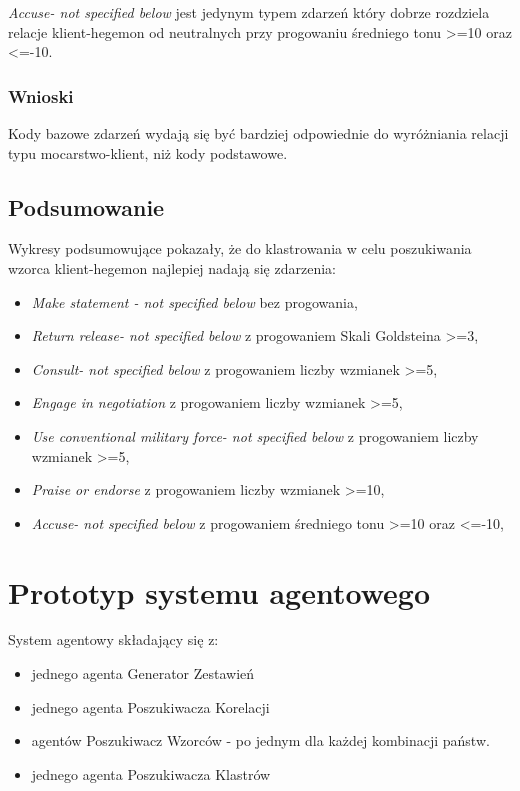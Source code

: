 \documentclass[11pt]{report}
\begin{document}
    \textit{Accuse- not specified below} jest jedynym typem zdarzeń który dobrze rozdziela relacje klient-hegemon od neutralnych
    przy progowaniu średniego tonu >=10 oraz <=-10.

    \subsubsection{Wnioski}
    Kody bazowe zdarzeń wydają się być bardziej odpowiednie do wyróżniania relacji typu mocarstwo-klient, niż kody podstawowe.

    \subsection{Podsumowanie}

    Wykresy podsumowujące pokazały, że do klastrowania w celu poszukiwania wzorca klient-hegemon najlepiej nadają się zdarzenia:
    \begin{itemize}
        \item \textit{Make statement - not specified below} bez progowania,
        \item \textit{Return release- not specified below} z progowaniem Skali Goldsteina >=3,
        \item \textit{Consult- not specified below} z progowaniem liczby wzmianek >=5,
        \item \textit{Engage in negotiation} z progowaniem liczby wzmianek >=5,
        \item \textit{Use conventional military force- not specified below} z progowaniem liczby wzmianek >=5,
        \item \textit{Praise or endorse} z progowaniem liczby wzmianek >=10,
        \item \textit{Accuse- not specified below} z progowaniem średniego tonu >=10 oraz <=-10,
    \end{itemize}


    \section{Prototyp systemu agentowego}

    System agentowy składający się z:
    \begin{itemize}
        \item jednego agenta Generator Zestawień
        \item jednego agenta Poszukiwacza Korelacji
        \item agentów Poszukiwacz Wzorców - po jednym dla każdej kombinacji państw.
        \item jednego agenta Poszukiwacza Klastrów
    \end{itemize}
\end{document}
